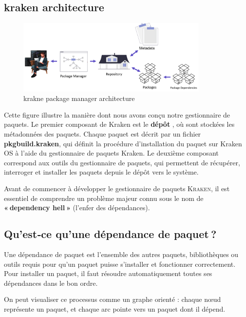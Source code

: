 \subsection{kraken architecture }


 


\begin{figure}[H]
  \centering
  \includegraphics[width=0.85\textwidth]{images_pfe/packagemanager.png}
  \caption{krakne package manager architecture }
  \label{fig:packagemanager}
\end{figure}


 Cette figure illustre la manière dont nous avons conçu notre gestionnaire de paquets. 
 Le premier composant de Kraken est le \textbf{dépôt} , où sont stockées les métadonnées des paquets. Chaque paquet est décrit par un fichier \textbf{pkgbuild.kraken}, qui définit la procédure d'installation du paquet sur Kraken OS à l'aide du gestionnaire de paquets Kraken. 
 Le deuxième composant correspond aux outils du gestionnaire de paquets, qui permettent de récupérer, interroger et installer les paquets depuis le dépôt vers le système. 

Avant de commencer à développer le gestionnaire de paquets \textsc{Kraken}, il est essentiel de comprendre un problème majeur connu sous le nom de \textbf{« dependency hell »} (l’enfer des dépendances).

\subsection{Qu’est‑ce qu’une dépendance de paquet ?}
\label{subsec:dependency}

Une dépendance de paquet est l’ensemble des autres paquets, bibliothèques ou outils requis pour qu’un paquet puisse s’installer et fonctionner correctement. Pour installer un paquet, il faut résoudre automatiquement toutes ses dépendances dans le bon ordre. 

On peut visualiser ce processus comme un graphe orienté : chaque nœud représente un paquet, et chaque arc pointe vers un paquet dont il dépend.  

